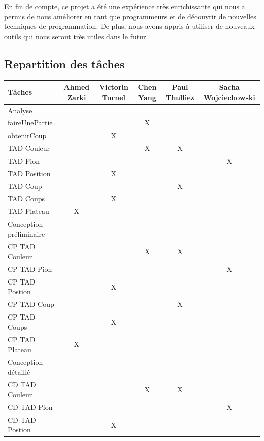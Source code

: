 \documentclass{article}
\begin{document}
\vspace{5mm}

En fin de compte, ce projet a été une expérience très enrichissante qui nous a permis de nous améliorer en tant que programmeurs et de découvrir de nouvelles techniques de programmation. De plus, nous avons appris à utiliser de nouveaux outils qui nous seront très utiles dans le futur.

\subsection{Repartition des tâches}
\begin{tabular}{|l|c|c|c|c|c|}
  \hline
  Tâches & Ahmed Zarki & Victorin Turnel & Chen Yang & Paul Thulliez & Sacha Wojciechowski \\
  \hline
  Analyse \\
  \hline
  faireUnePartie & & & X & & \\
  obtenirCoup & & X & & & \\
  TAD Couleur  & & & X & X &   \\
  TAD Pion & & & & & X \\
  TAD Position & & X & & &   \\
  TAD Coup & & & & X & \\
  TAD Coups & & X  & & &  \\
  TAD Plateau & X & & & & \\
  \hline
  Conception préliminaire \\
  \hline
  CP TAD Couleur & & & X & X & \\
  CP TAD Pion & & & & & X \\
  CP TAD Postion & & X & & &  \\
  CP TAD Coup & & & & X & \\              
  CP TAD Coups & & X & & & \\             
  CP TAD Plateau & X & & & & \\
  \hline
  Conception détaillé \\
  \hline
  CD TAD Couleur & & & X & X & \\                                                                                                                                                                       
  CD TAD Pion & & & & & X \\                                                                                   
  CD TAD Postion & & X & & &  \\                                                                                                                                                                         

\end{tabular}
\end{document}
